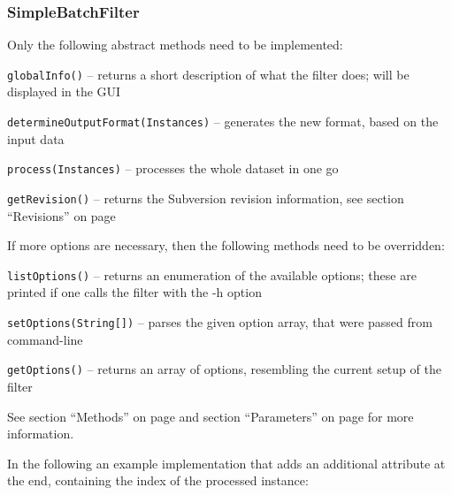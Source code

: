\subsubsection{SimpleBatchFilter}
Only the following abstract methods need to be implemented:
\begin{tight_itemize}
  \item \texttt{globalInfo()} -- returns a short description of what the
filter does; will be displayed in the GUI
  \item \texttt{determineOutputFormat(Instances)} -- generates the new
format, based on the input data
  \item \texttt{process(Instances)} -- processes the whole dataset in one
go
  \item \texttt{getRevision()} -- returns the Subversion revision information,
see section ``Revisions'' on page \pageref{filter_revisions}
\end{tight_itemize}
If more options are necessary, then the following methods need to be overridden:
\begin{tight_itemize}
  \item \texttt{listOptions()} -- returns an enumeration of the available
options; these are printed if one calls the filter with the -h option
  \item \texttt{setOptions(String[])} -- parses the given option array,
that were passed from command-line
  \item \texttt{getOptions()} -- returns an array of options, resembling
the current setup of the filter
\end{tight_itemize}
See section ``Methods'' on page \pageref{classifier_methods} and section
``Parameters'' on page \pageref{classifier_parameters} for more information.

\newpage
In the following an example implementation that adds an additional attribute at
the end, containing the index of the processed instance:

{\footnotesize }

\newpage
